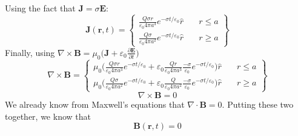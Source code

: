 \documentclass[12pt]{article}
\begin{document}
\begin{enumerate}[label=\alph*)]
    Using the fact that $\textbf{J} = \sigma \textbf{E}$:
    \begin{equation}
    \textbf{J}(\textbf{r}, t) = \left\{
        \begin{array}{ll}
            \frac{Q\sigma r}{\varepsilon_0 4 \pi a^3} e^{-\sigma t/\varepsilon_0}\hat{r} & \quad r \leq a \\
            \frac{Q\sigma  }{\varepsilon_0 4 \pi a^2}  e^{-\sigma t/\varepsilon_0}\hat{r} & \quad r \geq a
        \end{array}
    \right\}
    \label{eq:J}
    \end{equation}
    Finally, using $\nabla\times \textbf{B} = \mu_0 \Big(\textbf{J}+\varepsilon_0 \frac{\partial \textbf{E}}{\partial t}\Big)$
    \[\nabla \times \textbf{B} = \left\{
        \begin{array}{ll}
            \mu_0 \Big(\frac{Q\sigma r}{\varepsilon_0 4 \pi a^3} e^{-\sigma t/\varepsilon_0} + \varepsilon_0 \frac{Qr}{\varepsilon_0 4 \pi a^3} \frac{-\sigma}{\varepsilon_0}e^{-\sigma t/\varepsilon_0}\Big)\hat{r}& \quad r \leq a \\
            \mu_0 \Big(\frac{Q\sigma  }{\varepsilon_0 4 \pi a^2}  e^{-\sigma t/\varepsilon_0} + \varepsilon_0 \frac{Q}{\varepsilon_0 4 \pi a^2}  \frac{-\sigma}{\varepsilon_0}e^{-\sigma t/\varepsilon_0}\Big)\hat{r} & \quad r \geq a
        \end{array}
    \right
    \}\]
    \begin{equation}
    \nabla \times \textbf{B} = 0
    \label{eq:B}
    \end{equation}
    We already know from Maxwell's equations that $\nabla \cdot \textbf{B} = 0$. Putting these two together, we know that
    \[\textbf{B}(\textbf{r}, t) = 0\]
    

\end{enumerate}
\end{document}
